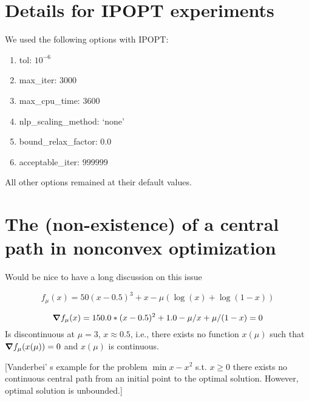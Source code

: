 \documentclass{article}
\begin{document}
\section{Details for IPOPT experiments}

We used the following options with IPOPT:

\begin{enumerate}
\item tol: $10^{-6}$
\item max\_iter: $3000$
\item max\_cpu\_time: $3600$
\item nlp\_scaling\_method: `none'
\item bound\_relax\_factor: $0.0$
\item acceptable\_iter: $999999$
\end{enumerate}
All other options remained at their default values.




\if{}

\section{The (non-existence) of a central path in nonconvex optimization}\label{app:non-existence-of-central-path}

Would be nice to have a long discussion on this issue

$$
f_{\mu}(x) = 50 (x - 0.5)^3 + x - \mu (\log(x) + \log(1 - x))
$$

$$
\grad f_{\mu}(x) = 150.0 * (x - 0.5)^2 + 1.0  - \mu / x + \mu / (1 - x) = 0 \\
$$
Is discontinuous at $\mu = 3$, $x \approx 0.5$, i.e., there exists no function $x(\mu)$ such that $\grad f_{\mu}(x(\mu)) = 0$ and $x(\mu)$ is continuous. 

[Vanderbei' s example for the problem $\min{ x -x^2}$ s.t. $x \ge 0$ there exists no continuous central path from an initial point to the optimal solution. However, optimal solution is unbounded.]

\fi
\end{document}
